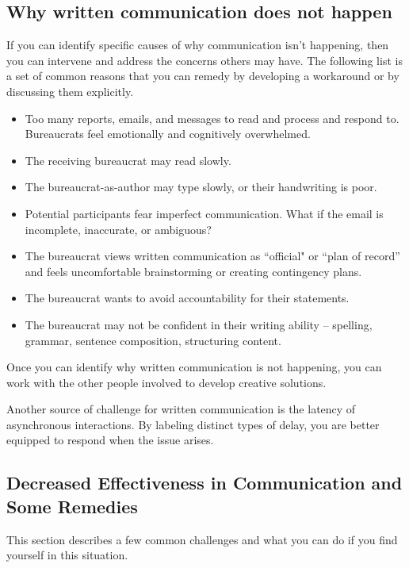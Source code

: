 \subsection*{Why written communication does not happen\label{sec:written-comm-does-not-happen}}
If you can identify specific causes of why communication isn't happening, then you can intervene and address the concerns others may have. The following list is a set of common reasons that you can remedy by developing a workaround or by discussing them explicitly. 
\begin{itemize}
    \item Too many reports, emails, and messages to read and process and respond to. Bureaucrats feel emotionally and cognitively overwhelmed.
\item The receiving bureaucrat may read slowly.
\item The bureaucrat-as-author may type slowly, or their handwriting is poor.
\item Potential participants fear imperfect communication. What if the email is incomplete, inaccurate, or ambiguous?
\item The bureaucrat views written communication as ``official" or ``plan of record'' and feels uncomfortable brainstorming or creating contingency plans.
\item The bureaucrat wants to avoid accountability for their statements.
\item The bureaucrat may not be confident in their writing ability -- spelling, grammar, sentence composition, structuring content.\iftoggle{boundbook}{}{\footnote{For tips on writing, see section~\ref{sec:resources-for-writing}\iftoggle{haspagenumbers}{ on page~\pageref{sec:resources-for-writing}.}{.}}}
\end{itemize}
Once you can identify why written communication is not happening, you can work with the other people involved to develop creative solutions. 

Another source of challenge for written communication is the latency of asynchronous interactions. By labeling distinct types of delay, you are better equipped to respond when the issue arises. 



\subsection*{Decreased Effectiveness in Communication and Some Remedies}

This section describes a few common challenges and what you can do if you find yourself in this situation.

